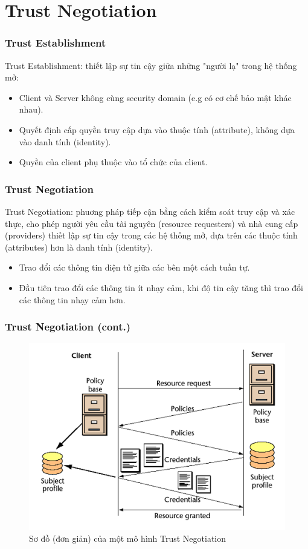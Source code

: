 \documentclass[11pt]{beamer}
\begin{document}
\section{Trust Negotiation}
\begin{frame}
\frametitle{Trust Establishment}
Trust Establishment: thiết lập sự tin cậy giữa những "người lạ" trong hệ thống mở:
\begin{itemize}
\item Client và Server không cùng security domain (e.g có cơ chế bảo mật khác nhau).
\item Quyết định cấp quyền truy cập dựa vào thuộc tính (attribute), không dựa vào danh tính (identity).
\item Quyền của client phụ thuộc vào tổ chức của client.
\end{itemize}
\end{frame}

\begin{frame}
\frametitle{Trust Negotiation}
Trust Negotiation: phuơng pháp tiếp cận bằng cách kiểm soát truy cập và xác thực, cho phép người yêu cầu tài nguyên (resource requesters) và nhà cung cấp (providers) thiết lập sự tin cậy trong các hệ thống mở, dựa trên các thuộc tính (attributes) hơn là danh tính (identity).
\begin{itemize}
\item Trao đổi các thông tin điện tử giữa các bên một cách tuần tự.
\item Đầu tiên trao đổi các thông tin ít nhạy cảm, khi độ tin cậy tăng thì trao đổi các thông tin nhạy cảm hơn.
\end{itemize}
\end{frame}


\begin{frame}
\frametitle{Trust Negotiation (cont.)}
\begin{figure}[H]
\centering
\includegraphics[scale=.4]{img/trust-simple.png}
\caption{Sơ đồ (đơn giản) của một mô hình Trust Negotiation}
\end{figure}
\end{frame}
\end{document}
